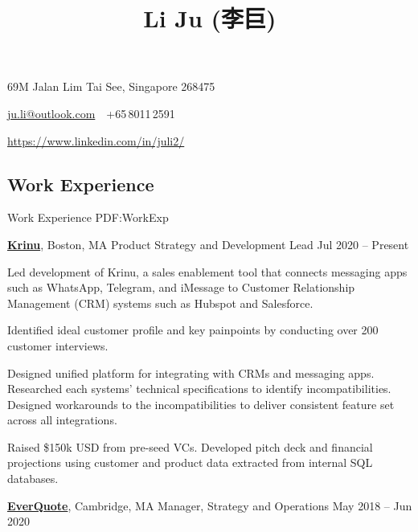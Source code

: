 \documentclass[letterpaper,10pt,oneside]{article}
\newcommand{\CVAuthor}{Li Ju (李巨)}
\begin{document}

\title{\CVAuthor}

\begin{subtitle}
69M Jalan Lim Tai See, Singapore 268475
\par
\href{mailto:ju.li@outlook.com}
{ju.li@outlook.com}
\,\SubBulletSymbol\,
+65\,8011\,2591
\par 
\href{https://www.linkedin.com/in/juli2/}{https://www.linkedin.com/in/juli2/}
\end{subtitle}

\begin{body}


\section
{Work\newline
Experience}
{Work Experience}
{PDF:WorkExp}

\href{https://krinu.com/}
{\textbf{Krinu}},
Boston, MA
\GapNoBreak
Product Strategy and Development Lead
\hfill
Jul 2020 -- Present
\begin{flushleft}

\BulletItem Led development of Krinu, a sales enablement tool that connects messaging apps such as WhatsApp, Telegram, and iMessage to Customer Relationship Management (CRM) systems such as Hubspot and Salesforce. 

\vspace{0.3em} \SubBulletItem 
Identified ideal customer profile and key painpoints by conducting over 200 customer interviews.  

\vspace{0.3em} \SubBulletItem Designed unified platform for integrating with CRMs and messaging apps. Researched each systems' technical specifications to identify incompatibilities. Designed workarounds to the incompatibilities to deliver consistent feature set across all integrations. 

\vspace{0.75em}
\BulletItem Raised \$150k USD from pre-seed VCs. Developed pitch deck and financial projections using customer and product data extracted from internal SQL databases. 

\end{flushleft}


\href{http://www.everquote.com/}
{\textbf{EverQuote}},
Cambridge, MA
\GapNoBreak
Manager, Strategy and Operations
\hfill
May 2018 -- Jun 2020
\begin{flushleft}


\end{flushleft}
\end{body}
\end{document}
